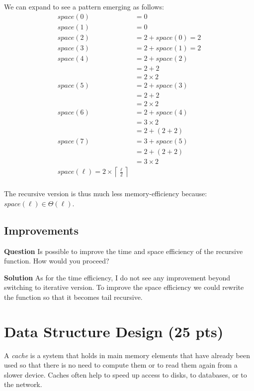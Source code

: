 \documentclass[11pt]{article}
\begin{document}
We can expand to see a pattern emerging as follows:
\begin{align*}
    space(0) &= 0 \\
    space(1) &= 0 \\
    space(2) &= 2 + space(0) = 2 \\
    space(3) &= 2 + space(1) = 2 \\
    space(4) &= 2 + space(2) \\
             &= 2 + 2 \\
             &= 2 \times 2 \\
    space(5) &= 2 + space(3) \\
             &= 2 + 2 \\
             &= 2 \times 2 \\
    space(6) &= 2 + space(4) \\
             &= 3 \times 2 \\
             &= 2 + (2 + 2) \\
    space(7) &= 3 + space(5) \\
             &= 2 + (2 + 2) \\
             &= 3 \times 2 \\
    space(\ell) = 2 \times \left\lceil \frac{\ell}{2} \right\rceil \\
\end{align*}

The recursive version is thus much less memory-efficiency because:
\(space(\ell) \in \Theta(\ell)\).


\subsection{Improvements}
\label{sec:org6a732a0}
\textbf{Question} Is possible to improve the time and space efficiency of
   the recursive function. How would you proceed?

\textbf{Solution} As for the time efficiency, I do not see any improvement
beyond switching to iterative version. To improve the space
efficiency we could rewrite the function so that it becomes tail
recursive.

\section{Data Structure Design (25 pts)}
\label{sec:org07df5db}

A \emph{cache} is a system that holds in main memory elements that have
already been used so that there is no need to compute them or to
read them again from a slower device. Caches often help to speed
up access to disks, to databases, or to the network.
\end{document}

